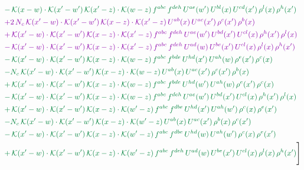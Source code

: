 \documentclass[10pt]{article}
\numberwithin{equation}{section}
\begin{document}
\begin{align}
&{\color{JIM} -\,\mathcal{K}(x-w)\cdot\mathcal{K}(x'-w')\,\mathcal{K}(x'-z)\cdot\mathcal{K}(w-z)\,f^{abc}\,f^{deh}\,U^{ae}(w')\,U^{bl}(x)\,U^{cd}(x')\,\rho^{l}(x)\,\rho^{h}(x')} \notag\\
&{\color{CC} +2\,N_{c}\,\mathcal{K}(x'-w)\cdot\mathcal{K}(x'-w')\,\mathcal{K}(x-z)\cdot\mathcal{K}(x'-z)\,U^{ab}(x)\,U^{ac}(x')\,\rho^{c}(x')\,\rho^{b}(x)} \notag\\
&{\color{CC} +\,\mathcal{K}(x'-w)\cdot\mathcal{K}(x'-w')\,\mathcal{K}(x-z)\cdot\mathcal{K}(x'-z)\,f^{abc}\,f^{deh}\,U^{ae}(w')\,U^{bd}(x')\,U^{cl}(x)\,\rho^{h}(x')\,\rho^{l}(x)} \notag\\
&{\color{CC} -\,\mathcal{K}(x'-w)\cdot\mathcal{K}(x'-w')\,\mathcal{K}(x-z)\cdot\mathcal{K}(x'-z)\,f^{abc}\,f^{deh}\,U^{ad}(w)\,U^{be}(x')\,U^{cl}(x)\,\rho^{l}(x)\,\rho^{h}(x')} \notag\\
&{\color{JIM} -\,\mathcal{K}(x'-w)\cdot\mathcal{K}(x'-w')\,\mathcal{K}(x-z)\cdot\mathcal{K}(w-z)\,f^{abc}\,f^{bde}\,U^{hd}(x')\,U^{ah}(w)\,\rho^{e}(x')\,\rho^{c}(x)} \notag\\
&{\color{JIM} -N_{c}\,\mathcal{K}(x'-w)\cdot\mathcal{K}(x'-w')\,\mathcal{K}(x-z)\cdot\mathcal{K}(w-z)\,U^{ab}(x)\,U^{ac}(x')\,\rho^{c}(x')\,\rho^{b}(x)} \notag\\
&{\color{JIM} +\,\mathcal{K}(x'-w)\cdot\mathcal{K}(x'-w')\,\mathcal{K}(x-z)\cdot\mathcal{K}(w-z)\,f^{abc}\,f^{bde}\,U^{hd}(w')\,U^{ah}(w)\,\rho^{e}(x')\,\rho^{c}(x)} \notag\\
&{\color{JIM} -\,\mathcal{K}(x'-w)\cdot\mathcal{K}(x'-w')\,\mathcal{K}(x-z)\cdot\mathcal{K}(w-z)\,f^{abc}\,f^{deh}\,U^{ae}(w')\,U^{bd}(x')\,U^{cl}(x)\,\rho^{h}(x')\,\rho^{l}(x)} \notag\\
&{\color{JIM} +\,\mathcal{K}(x'-w)\cdot\mathcal{K}(x'-w')\,\mathcal{K}(x-z)\cdot\mathcal{K}(w'-z)\,f^{abc}\,f^{dbe}\,U^{hd}(x')\,U^{ah}(w')\,\rho^{c}(x)\,\rho^{e}(x')} \notag\\
&{\color{JIM} -N_{c}\,\mathcal{K}(x'-w)\cdot\mathcal{K}(x'-w')\,\mathcal{K}(x-z)\cdot\mathcal{K}(w'-z)\,U^{ab}(x)\,U^{ac}(x')\,\rho^{b}(x)\,\rho^{c}(x')} \notag\\
&{\color{JIM} -\,\mathcal{K}(x'-w)\cdot\mathcal{K}(x'-w')\,\mathcal{K}(x-z)\cdot\mathcal{K}(w'-z)\,f^{abc}\,f^{dbe}\,U^{hd}(w)\,U^{ah}(w')\,\rho^{c}(x)\,\rho^{e}(x')} \notag\\
&{\color{JIM} +\,\mathcal{K}(x'-w)\cdot\mathcal{K}(x'-w')\,\mathcal{K}(x-z)\cdot\mathcal{K}(w'-z)\,f^{abc}\,f^{deh}\,U^{ad}(w)\,U^{be}(x')\,U^{cl}(x)\,\rho^{l}(x)\,\rho^{h}(x') }\Bigg] \end{align}
\end{document}
